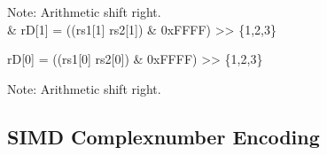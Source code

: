\documentclass[letterpaper,10pt,english]{sphinxmanual}
\begin{document}
\begin{savenotes}
\begin{tabular}[t]{}
\sphinxAtStartPar
Note: Arithmetic shift right.
\\
\sphinxhline
\sphinxAtStartPar
{}
&
\sphinxAtStartPar
rD{[}1{]} = ((rs1{[}1{]} \sphinxhyphen{} rs2{[}1{]}) \& 0xFFFF) \textgreater{}\textgreater{} \{1,2,3\}

\sphinxAtStartPar
rD{[}0{]} = ((rs1{[}0{]} \sphinxhyphen{} rs2{[}0{]}) \& 0xFFFF) \textgreater{}\textgreater{} \{1,2,3\}

\sphinxAtStartPar
Note: Arithmetic shift right.
\\
\sphinxbottomrule
\end{tabular}
\sphinxtableafterendhook\par
\sphinxattableend\end{savenotes}


\subsection{SIMD Complex\sphinxhyphen{}number Encoding}
\label{\detokenize{instruction_set_extensions:simd-complex-number-encoding}}
\end{document}
